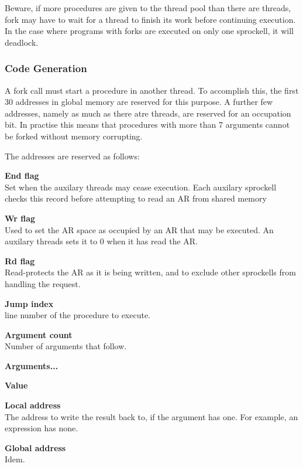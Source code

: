 \documentclass[twoside]{report}
\begin{document}
Beware, if more procedures are given to the thread pool than there are threads, fork may have to wait for a thread to finish its work before continuing execution. In the case where programs with forks are executed on only one sprockell, it will deadlock.
\subsubsection*{Code Generation}
A fork call must start a procedure in another thread. To accomplish this, the first 30 addresses in global memory are reserved for this purpose. A further few addresses, namely as much as there atre threads, are reserved for an occupation bit. In practise this means that procedures with more than 7 arguments cannot be forked without memory corrupting.

The addresses are reserved as follows:

\begin{compactitem}
	\item \textbf{End flag} \\ Set when the auxilary threads may cease execution. Each auxilary sprockell checks this record before attempting to read an AR from shared memory  
	\item \textbf{Wr flag} \\ Used to set the AR space as occupied by an AR that may be executed. An auxilary threads sets it to 0 when it has read the AR.
	\item \textbf{Rd flag} \\ Read-protects the AR as it is being written, and to exclude other sprockells from handling the request.
	\item \textbf{Jump index} \\ line number of the procedure to execute.
	\item \textbf{Argument count} \\ Number of arguments that follow.
	\item \textbf{Arguments...}
	\begin{compactitem}
		\item \textbf{Value}
		\item \textbf{Local address} \\ The address to write the result back to, if the argument has one. For example, an expression has none.
		\item \textbf{Global address} \\  Idem.
	\end{compactitem}
\end{compactitem}
\end{document}
